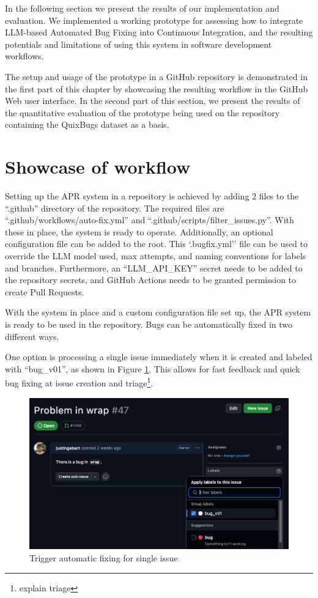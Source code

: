 In the following section we present the results of our implementation and evaluation. We implemented a working prototype for assessing how to integrate LLM-based Automated Bug Fixing into Continuous Integration, and the resulting potentials and limitations of using this system in software development workflows.

The setup and usage of the prototype in a GitHub repository is demonstrated in the first part of this chapter by showcasing the resulting workflow in the GitHub Web user interface. In the second part of this section, we present the results of the quantitative evaluation of the prototype being used on the repository containing the QuixBugs dataset as a basis.

\section{Showcase of workflow} \label{section:showcase}

Setting up the APR system in a repository is achieved by adding 2 files to the ``.github'' directory of the repository. The required files are ``.github/workflows/auto-fix.yml'' and ``.github/scripts/filter\_issues.py''. With these in place, the system is ready to operate. Additionally, an optional configuration file can be added to the root. This `.bugfix.yml'' file can be used to override the LLM model used, max attempts, and naming conventions for labels and branches. Furthermore, an ``LLM\_API\_KEY'' secret needs to be added to the repository secrets, and GitHub Actions needs to be granted permission to create Pull Requests.

With the system in place and a custom configuration file set up, the APR system is ready to be used in the repository. Bugs can be automatically fixed in two different ways.

One option is processing a single issue immediately when it is created and labeled with ``bug\_v01'', as shown in Figure \ref{fig:issue-trigger}. This allows for fast feedback and quick bug fixing at issue creation and triage\footnote{explain triage}.

\begin{figure}[H]
    \centering
    \includegraphics[width=1\textwidth]{images/workflow/label_issue.png}
    \caption{Trigger automatic fixing for single issue}
    \label{fig:issue-trigger}
\end{figure}

